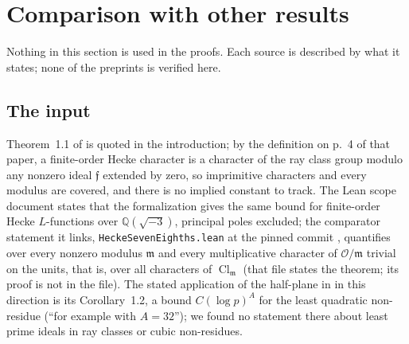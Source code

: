 \documentclass[11pt]{article}
\theoremstyle{definition}
\theoremstyle{remark}
\numberwithin{equation}{section}
\newcommand{\Q}{\mathbb Q}
\newcommand{\cO}{\mathcal O}
\newcommand{\fm}{\mathfrak m}
\newcommand{\ff}{\mathfrak f}
\newcommand{\Cl}{\operatorname{Cl}}
\begin{document}
\section{Comparison with other results}\label{sec:related}

Nothing in this section is used in the proofs. Each source is described by what it states; none of the preprints is verified here.

\subsection{The input}\label{sec:input}
Theorem~1.1 of \cite{openai2026q} is quoted in the introduction; by the definition on p.~4 of that paper, a finite-order Hecke character is a character of the ray class group modulo any nonzero ideal $\ff$ extended by zero, so imprimitive characters and every modulus are covered, and there is no implied constant to track. The Lean scope document \cite{openai2026lean} states that the formalization gives the same bound for finite-order Hecke $L$-functions over $\Q(\sqrt{-3})$, principal poles excluded; the comparator statement it links, \texttt{HeckeSevenEighths.lean} at the pinned commit \cite{openai2026heckelean}, quantifies over every nonzero modulus $\fm$ and every multiplicative character of $\cO/\fm$ trivial on the units, that is, over all characters of $\Cl_\fm$ (that file states the theorem; its proof is not in the file). The stated application of the half-plane in \cite{openai2026q} in this direction is its Corollary~1.2, a bound $C(\log p)^A$ for the least quadratic non-residue (``for example with $A=32$''); we found no statement there about least prime ideals in ray classes or cubic non-residues.
\end{document}

